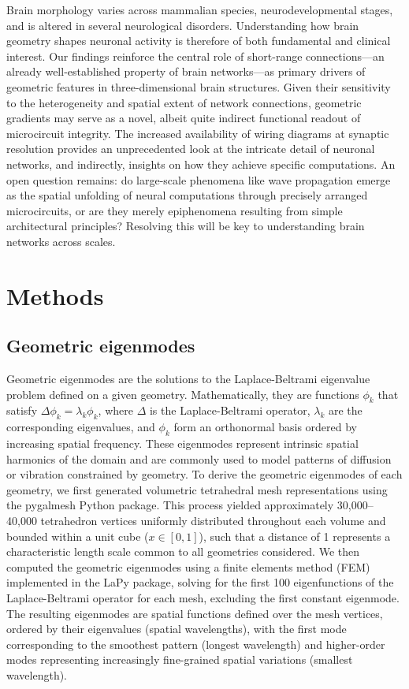 \documentclass{article}
\begin{document}
Brain morphology varies across mammalian species, neurodevelopmental stages, and is altered in several neurological disorders. Understanding how brain geometry shapes neuronal activity is therefore of both fundamental and clinical interest. Our findings reinforce the central role of short-range connections---an already well-established property of brain networks---as primary drivers of geometric features in three-dimensional brain structures. Given their sensitivity to the heterogeneity and spatial extent of network connections, geometric gradients may serve as a novel, albeit quite indirect functional readout of microcircuit integrity. The increased availability of wiring diagrams at synaptic resolution provides an unprecedented look at the intricate detail of neuronal networks, and indirectly, insights on how they achieve specific computations. An open question remains: do large-scale phenomena like wave propagation emerge as the spatial unfolding of neural computations through precisely arranged microcircuits, or are they merely epiphenomena resulting from simple architectural principles? Resolving this will be key to understanding brain networks across scales.

\section*{Methods}

\subsection*{Geometric eigenmodes}

Geometric eigenmodes are the solutions to the Laplace-Beltrami eigenvalue problem defined on a given geometry. Mathematically, they are functions $\phi_k$ that satisfy $\Delta \phi_k=\lambda_k\phi_k$, where $\Delta$ is the Laplace-Beltrami operator, $\lambda_k$ are the corresponding eigenvalues, and $\phi_k$ form an orthonormal basis ordered by increasing spatial frequency. These eigenmodes represent intrinsic spatial harmonics of the domain and are commonly used to model patterns of diffusion or vibration constrained by geometry. To derive the geometric eigenmodes of each geometry, we first generated volumetric tetrahedral mesh representations using the pygalmesh Python package. This process yielded approximately 30,000–40,000 tetrahedron vertices uniformly distributed throughout each volume and bounded within a unit cube ($x\in[0,1]$), such that a distance of 1 represents a characteristic length scale common to all geometries considered. We then computed the geometric eigenmodes using a finite elements method (FEM) implemented in the LaPy package, solving for the first 100 eigenfunctions of the Laplace-Beltrami operator for each mesh, excluding the first constant eigenmode. The resulting eigenmodes are spatial functions defined over the mesh vertices, ordered by their eigenvalues (spatial wavelengths), with the first mode corresponding to the smoothest pattern (longest wavelength) and higher-order modes representing increasingly fine-grained spatial variations (smallest wavelength).
\end{document}
